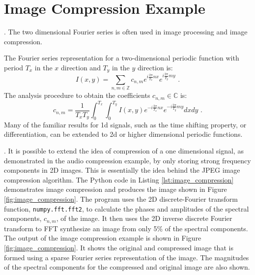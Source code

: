 \newpage
\section{Image Compression Example}
. The two
dimensional Fourier series is often used in image processing and image
compression.

The Fourier series representation for a two-dimensional periodic
function with period $T_x$ in the $x$ direction and $T_y$ in the $y$
direction is:
\begin{equation}
I(x,y) = \sum_{n,m \in \mathbb{Z}} c_{n,m} e^{i \frac{2\pi}{T_x}nx} e^{i \frac{2\pi}{T_y}my} \,\,.
\end{equation}
The analysis procedure to obtain the coefficients $c_{n,m}\in \mathbb{C}$ is:
\begin{equation}
c_{n,m} = \frac{1}{T_x T_y}\int_{0}^{T_x}\int_0^{T_y} I(x,y) e^{-i \frac{2\pi}{T_x}nx} e^{-i \frac{2\pi}{T_y}my}dx dy \,\,.
\label{eq:2d_analysis}
\end{equation}
Many of the familiar results for 1d signals, such as the time shifting
property, or differentiation, can be extended to 2d or higher
dimensional periodic functions. 


.  It is possible to
extend the idea of compression of a one dimensional signal, as
demonstrated in the audio compression example, by only storing strong
frequency components in 2D images. This is essentially the idea
behind the JPEG image compression algorithm.  The Python code in
Listing \ref{lst:image_compression} demonstrates image compression and
produces the image shown in Figure \ref{fig:image_compression}. The
program uses the 2D discrete-Fourier transform function,
\verb|numpy.fft.fft2|, to calculate the phases and amplitudes of the
spectral components, $c_{n,m}$, of the image. It then uses the 2D
inverse discrete Fourier transform to FFT synthesize an image from
only 5\% of the spectral components. The output of the image
compression example is shown in Figure \ref{fig:image_compression}. It
shows the original and compressed image that is formed using a sparse
Fourier series representation of the image. The magnitudes of the
spectral components for the compressed and original image are also
shown.

